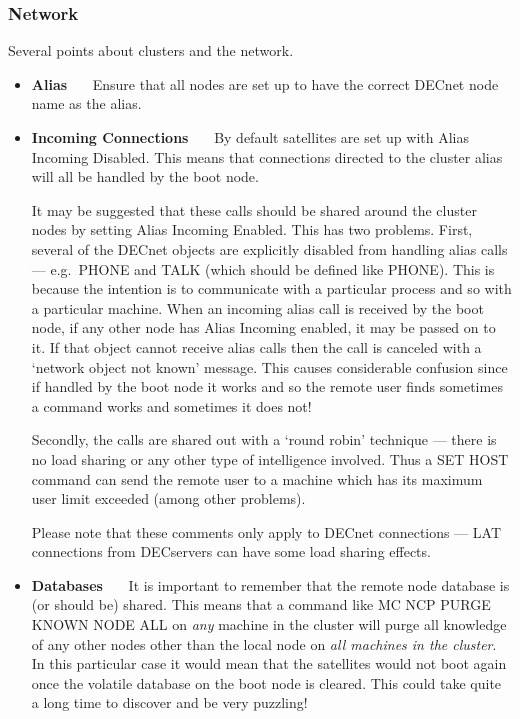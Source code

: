 \subsubsection {Network}

Several points about clusters and the network.

\begin {itemize}
\item {\bf Alias}
~~~Ensure that all nodes are set up to have the correct DECnet node
name as the alias.

\item {\bf Incoming Connections}
~~~By default satellites are set up with Alias Incoming Disabled.
This means that connections directed to the cluster alias will all be handled
by the boot node.

It may be suggested that these calls should be shared around the cluster nodes
by setting Alias Incoming Enabled.
This has two problems.
First, several of the DECnet objects are explicitly disabled from handling
alias calls --- e.g.\ PHONE and TALK (which should be defined like PHONE).
This is because the intention is to communicate with a particular process and
so with a particular machine.
When an incoming alias call is received by the boot node, if any other node has
Alias Incoming enabled, it may be passed on to it.
If that object cannot receive alias calls then the call is canceled with a
`network object not known' message.
This causes considerable confusion since if handled by the boot node it works
and so the remote user finds sometimes a command works and sometimes it does
not!

Secondly, the calls are shared out with a `round robin' technique --- there is
no load sharing or any other type of intelligence involved.
Thus a SET HOST command can send the remote user to a machine which has its
maximum user limit exceeded (among other problems).

Please note that these comments only apply to DECnet connections --- LAT
connections from DECservers can have some load sharing effects.

\item {\bf Databases}
~~~It is important to remember that the remote node database is (or should be)
shared.
This means that a command like MC NCP PURGE KNOWN NODE ALL on {\em any} machine
in the cluster will purge all knowledge of any other nodes other than the
local node on {\em all machines in the cluster}.
In this particular case it would mean that the satellites would not boot again
once the volatile database on the boot node is cleared.
This could take quite a long time to discover and be very puzzling!


\end{itemize}

